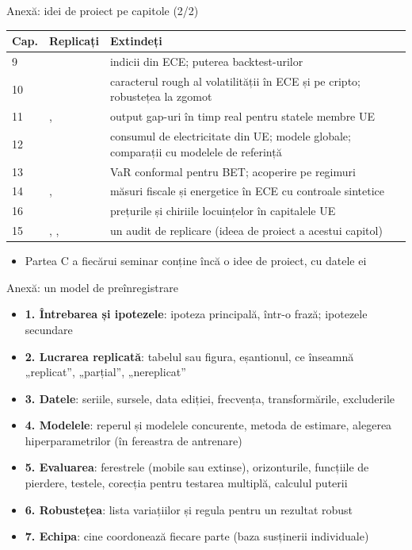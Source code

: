 \begin{frame}{Anexă: idei de proiect pe capitole (2/2)}
\hypertarget{atsapp2}{}
\itemsize{\small}
\begin{center}
\scriptsize
\begin{tabular}{l>{\raggedright\arraybackslash}p{5.0cm}>{\raggedright\arraybackslash}p{6.6cm}}
\toprule
\textbf{Cap.} & \textbf{Replicați} & \textbf{Extindeți} \\
\midrule
9 & {} & indicii din ECE; puterea backtest-urilor \\
10 & {} & caracterul rough al volatilității în ECE și pe cripto; robustețea la zgomot \\
11 & , {} & output gap-uri în timp real pentru statele membre UE \\
12 & {} & consumul de electricitate din UE; modele globale; comparații cu modelele de referință \\
13 & {} & VaR conformal pentru BET; acoperire pe regimuri \\
14 & , {} & măsuri fiscale și energetice în ECE cu controale sintetice \\
16 & {} & prețurile și chiriile locuințelor în capitalele UE \\
15 & , , {} & un audit de replicare (ideea de proiect a acestui capitol) \\
\bottomrule
\end{tabular}
\end{center}
\begin{itemize}
    \item Partea C a fiecărui seminar conține încă o idee de proiect, cu datele ei
\end{itemize}
\end{frame}

\begin{frame}{Anexă: un model de preînregistrare}
\hypertarget{atsapp3}{}
\itemsize{\small}
\begin{itemize}
    \item \textbf{1. Întrebarea și ipotezele}: ipoteza principală, într-o frază; ipotezele secundare
    \item \textbf{2. Lucrarea replicată}: tabelul sau figura, eșantionul, ce înseamnă „replicat”, „parțial”, „nereplicat”
    \item \textbf{3. Datele}: seriile, sursele, data ediției, frecvența, transformările, excluderile
    \item \textbf{4. Modelele}: reperul și modelele concurente, metoda de estimare, alegerea hiperparametrilor (în fereastra de antrenare)
    \item \textbf{5. Evaluarea}: ferestrele (mobile sau extinse), orizonturile, funcțiile de pierdere, testele, corecția pentru testarea multiplă, calculul puterii
    \item \textbf{6. Robustețea}: lista variațiilor și regula pentru un rezultat robust
    \item \textbf{7. Echipa}: cine coordonează fiecare parte (baza susținerii individuale)
\end{itemize}
\end{frame}


